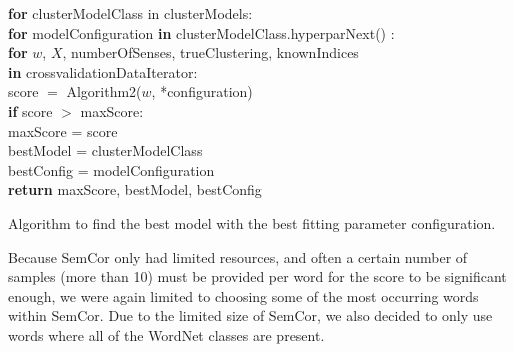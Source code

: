 \documentclass[a4paper,12pt,twoside,openright]{report}
\begin{document}
\begin{algorithm}[H]
\SetAlgoLined
{}

\textbf{for} clusterModelClass in clusterModels:  \\
\quad \quad \textbf{for} modelConfiguration \textbf{in} clusterModelClass.hyperparNext() :  \\
\quad \quad \quad \quad \textbf{for} $w$, $X$, numberOfSenses, trueClustering, knownIndices \\
\quad \quad \quad \quad \textbf{in} crossvalidationDataIterator:  \\

\quad \quad \quad \quad \quad \quad score $=$ Algorithm2($w$, *configuration) \\
\quad \quad \quad \quad \quad \quad \textbf{if} score $>$ maxScore: \\
\quad \quad \quad \quad \quad \quad \quad \quad  maxScore = score \\
\quad \quad \quad \quad \quad \quad \quad \quad  bestModel = clusterModelClass \\
\quad \quad \quad \quad \quad \quad \quad \quad  bestConfig = modelConfiguration \\

\textbf{return} maxScore, bestModel, bestConfig
 
 \caption{Algorithm to find the best model with the best fitting parameter configuration.}
\end{algorithm}

\hfill \break

Because SemCor only had limited resources, and often a certain number of samples (more than 10) must be provided per word for the score to be significant enough, we were again limited to choosing some of the most occurring words within SemCor.
Due to the limited size of SemCor, we also decided to only use words where all of the WordNet classes are present.
\end{document}
